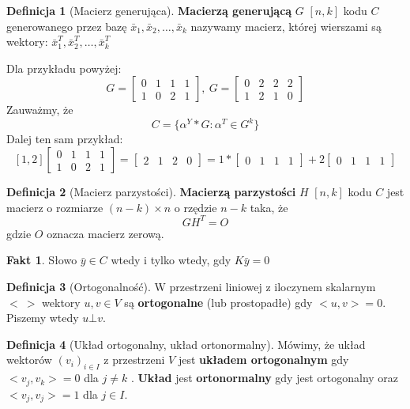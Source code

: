 \documentclass[a4paper,12pt]{article}
\theoremstyle{definition}%
\newtheorem*{fact*}{Fakt} %
\theoremstyle{definition}
\newtheorem{definition}{Definicja}%
\theoremstyle{problem}
\begin{document}
\begin{definition}[Macierz generująca]\textbf{Macierzą generującą} $G$ $[n,k]$ kodu $C$ generowanego przez bazę $\bar{x}_1,\bar{x}_2,\dots ,\bar{x}_k$ nazywamy macierz, której wierszami są wektory: $\bar{x}_1^T,\bar{x}_2^T,\dots ,\bar{x}_k^T$

Dla przykładu powyżej:
$$G=\begin{bmatrix}
0&1&1&1\\
1&0&2&1
\end{bmatrix},\ G=\begin{bmatrix}
0&2&2&2\\
1&2&1&0
\end{bmatrix}$$
Zauważmy, że $$C=\{\alpha ^Y*G:\alpha ^T\in G^k\}$$
Dalej ten sam przykład:
$$[ 1, 2 ] \begin{bmatrix}
0&1&1&1\\
1&0&2&1
\end{bmatrix}=\begin{bmatrix}
2&1&2&0
\end{bmatrix}=1*\begin{bmatrix}
0&1&1&1
\end{bmatrix}+2\begin{bmatrix}
0&1&1&1
\end{bmatrix}$$
\end{definition}



\begin{definition}[Macierz parzystości]
\textbf{Macierzą parzystości} $H$ $[n,k]$ kodu $C$ jest macierz o rozmiarze $(n-k)\times n$ o rzędzie $n-k$ taka, że $$GH^T=O$$ gdzie $O$ oznacza macierz zerową. 
\end{definition}
\begin{fact*}
Słowo $\bar{y}\in C$ wtedy i tylko wtedy, gdy $K\bar{y}=0$
\end{fact*}

\begin{definition}[Ortogonalność]
W przestrzeni liniowej z iloczynem skalarnym $<\ >$ wektory $u,v\in V$ są \textbf{ortogonalne} (lub prostopadłe) gdy $<u,v>=0$. Piszemy wtedy $u\bot v$.
\end{definition}

\begin{definition}[Układ ortogonalny, układ ortonormalny]
Mówimy, że układ wektorów $(v_i)_{i\in I}$ z przestrzeni $V$ jest \textbf{układem ortogonalnym} gdy $<v_j, v_k> = 0$ dla $j\neq k$ . \textbf{Układ} jest \textbf{ortonormalny} gdy jest ortogonalny oraz $<v_j
, v_j> = 1$ dla $j\in I$.
\end{definition}
\end{document}
